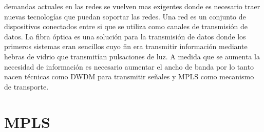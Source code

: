 \documentclass[10pt,journal,compsoc]{IEEEtran}
\begin{document}




% 
% 
% 
% 
 demandas actuales en las redes se vuelven mas exigentes donde es necesario traer nuevas tecnologías que puedan soportar las redes. Una red es un conjunto de dispositivos conectados entre si que se utiliza como canales de transmisión de datos. La fibra óptica es una solución para la transmisión de datos donde los primeros sistemas eran sencillos cuyo fin era transmitir información mediante hebras de vidrio que transmitían pulsaciones de luz. A medida que se aumenta la necesidad de información es necesario aumentar el ancho de banda por lo tanto nacen técnicas como DWDM para transmitir señales y MPLS como mecanismo de transporte. 


\section {MPLS}
\end{document}
